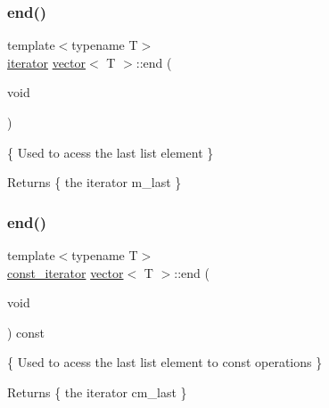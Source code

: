 \subsubsection{\texorpdfstring{end()}{end()}\hspace{0.1cm}{\footnotesize\ttfamily [1/2]}}
{\footnotesize\ttfamily template$<$typename T$>$ \\
\hyperlink{classMyIterator}{iterator} \hyperlink{classvector}{vector}$<$ T $>$\+::end (\begin{DoxyParamCaption}\item[{void}]{ }\end{DoxyParamCaption})\hspace{0.3cm}{\ttfamily [inline]}}



\{ Used to acess the last list element \} 

\begin{DoxyReturn}{Returns}
\{ the iterator m\+\_\+last \} 
\end{DoxyReturn}
\mbox{\label{classvector_abac232da26cdc5da35fdf597fc3f3b26}} 
\subsubsection{\texorpdfstring{end()}{end()}\hspace{0.1cm}{\footnotesize\ttfamily [2/2]}}
{\footnotesize\ttfamily template$<$typename T$>$ \\
\hyperlink{classMyIterator}{const\+\_\+iterator} \hyperlink{classvector}{vector}$<$ T $>$\+::end (\begin{DoxyParamCaption}\item[{void}]{ }\end{DoxyParamCaption}) const\hspace{0.3cm}{\ttfamily [inline]}}



\{ Used to acess the last list element to const operations \} 

\begin{DoxyReturn}{Returns}
\{ the iterator cm\+\_\+last \} 
\end{DoxyReturn}
\mbox{\label{classvector_acf8299f95b39286a0e249deb44b19413}} 
